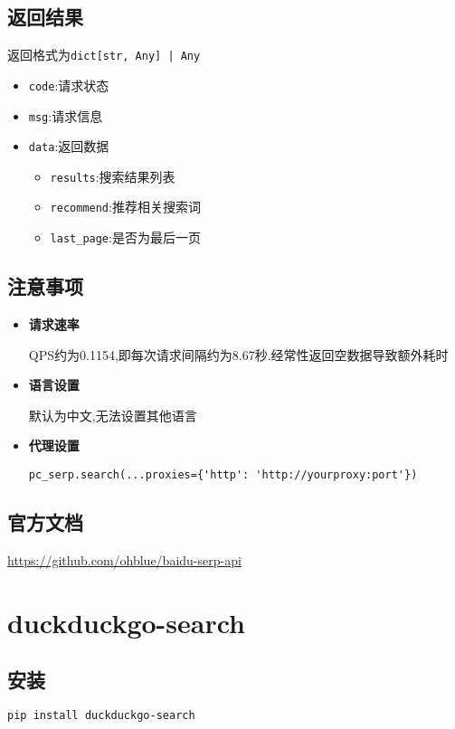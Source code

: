 \documentclass[a4paper,12pt]{article}
\begin{document}
\subsection{返回结果}
返回格式为\verb!dict[str, Any] | Any!
\begin{itemize}
    \item \verb|code|:请求状态
    \item \verb|msg|:请求信息
    \item \verb|data|:返回数据
    \begin{itemize}
        \item \verb|results|:搜索结果列表
        \item \verb|recommend|:推荐相关搜索词
        \item \verb|last_page|:是否为最后一页
    \end{itemize}
\end{itemize}

\subsection{注意事项}
\begin{itemize}
    \item \textbf{请求速率}
    
    QPS约为0.1154,即每次请求间隔约为8.67秒.经常性返回空数据导致额外耗时
    \item \textbf{语言设置}

    默认为中文,无法设置其他语言
    \item \textbf{代理设置}

    \verb|pc_serp.search(...proxies={'http': 'http://yourproxy:port'})|
\end{itemize}

\subsection{官方文档}
\url{https://github.com/ohblue/baidu-serp-api}

\section{duckduckgo-search}
\subsection{安装}
\begin{lstlisting}[language=bash]
pip install duckduckgo-search
\end{lstlisting}
\end{document}

